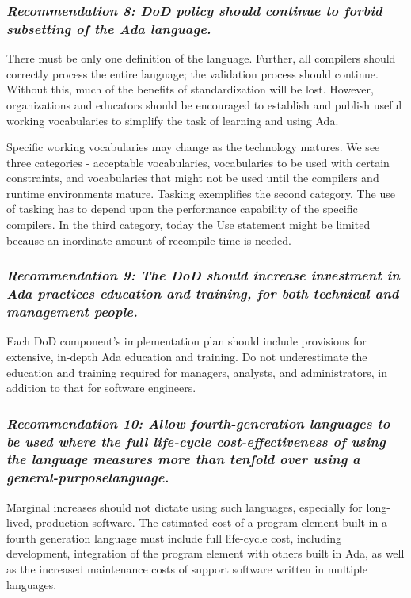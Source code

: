 \documentclass[12pt]{article}
\begin{document}
\subsubsection*{\textit{Recommendation 8: DoD policy should continue to forbid subsetting of the Ada
language.}}

There must be only one definition of the language. Further, all compilers
should correctly process the entire language; the validation process should
continue. Without this, much of the benefits of standardization will be lost.
However, organizations and educators should be encouraged to establish and
publish useful working vocabularies to simplify the task of learning and using
Ada.

Specific working vocabularies may change as the technology matures. We see
three categories - acceptable vocabularies, vocabularies to be used with
certain constraints, and vocabularies that might not be used until the
compilers and runtime environments mature. Tasking exemplifies the second
category. The use of tasking has to depend upon the performance capability of
the specific compilers. In the third category, today the Use statement might be
limited because an inordinate amount of recompile time is needed.

\subsubsection*{\textit{Recommendation 9: The DoD should increase investment in
Ada practices education and training, for both technical and management
people.}}

Each DoD component's implementation plan should include provisions for
extensive, in-depth Ada education and training. Do not underestimate the
education and training required for managers, analysts, and administrators, in
addition to that for software engineers.

\subsubsection*{\textit{Recommendation 10: Allow fourth-generation languages to
be used where the full life-cycle cost-effectiveness of using the language
measures more than tenfold over using a general-purposelanguage.}}

Marginal increases should not dictate using such languages, especially for
long-lived, production software. The estimated cost of a program element built
in a fourth generation language must include full life-cycle cost, including
development, integration of the program element with others built in Ada, as
well as the increased maintenance costs of support software written in multiple
languages.
\end{document}
